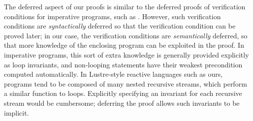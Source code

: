 The deferred aspect of our proofs is similar to the deferred proofs of verification conditions for imperative programs, such as \cite{oconnor2019deferring}.
However, such verification conditions are \emph{syntactically} deferred so that the verification condition can be proved later; in our case, the verification conditions are \emph{semantically} deferred, so that more knowledge of the enclosing program can be exploited in the proof.
In imperative programs, this sort of extra knowledge is generally provided explicitly as loop invariants, and non-looping statements have their weakest precondition computed automatically.
In Lustre-style reactive languages such as ours, programs tend to be composed of many nested recursive streams, which perform a similar function to loops.
Explicitly specifying an invariant for each recursive stream would be cumbersome; deferring the proof allows such invariants to be implicit.








